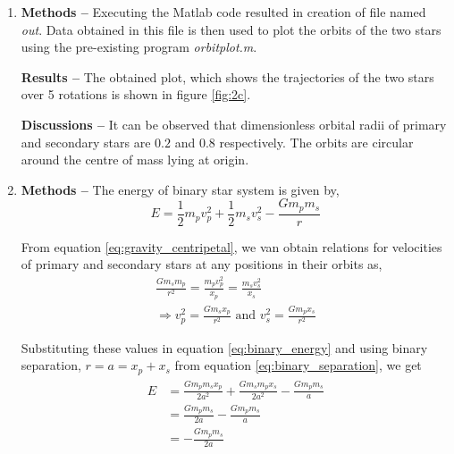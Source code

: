 \documentclass[a4paper]{article}
\begin{document}
\begin{enumerate} [label*=\textbf{(\alph*)}]
			
			\item
				\subitem \textbf{Methods  --}
				Executing the Matlab code resulted in creation of file named \emph{out}. Data obtained in this file is then used to plot the orbits of the two stars using the pre-existing program \emph{orbitplot.m}.
				
				\subitem \textbf{Results  --}
				The obtained plot, which shows the trajectories of the two stars over 5 rotations is shown in figure \ref{fig:2c}. 
				
				\subitem \textbf{Discussions  --}
				It can be observed that dimensionless orbital radii of primary and secondary stars are \(0.2\) and \(0.8\) respectively. The orbits are circular around the centre of mass lying at origin.
			
			
			\item
				\subitem \textbf{Methods  --}
				The energy of binary star system is given by,
				\begin{equation}
					E = \frac{1}{2} m_p v_p^2 + \frac{1}{2} m_s v_s^2 - \frac{G m_p m_s}{r}
					\label{eq:binary_energy}
				\end{equation}
				
				From equation \ref{eq:gravity_centripetal}, we van obtain relations for velocities of primary and secondary stars at any positions in their orbits as,
				\begin{equation}
					\begin{gathered}
						\frac{G m_s m_p}{r^2} = \frac{m_p v_p^2}{x_p} = \frac{m_s v_s^2}{x_s} \\
						\Rightarrow v_p^2 = \frac{G m_s x_p}{r^2} \text{ and } v_s^2 = \frac{G m_p x_s}{r^2}
					\end{gathered}
				\end{equation}
				
				Substituting these values in equation \ref{eq:binary_energy} and using binary separation, \(r = a = x_p+x_s\) from equation \ref{eq:binary_separation}, we get
				\begin{equation}
					\begin{gathered}
						\begin{aligned}
							E &= \frac{G m_p m_s x_p}{2a^2} + \frac{G m_s m_p x_s}{2a^2} - \frac{G m_p m_s}{a} \\
							&= \frac{G m_p m_s}{2a} - \frac{G m_p m_s}{a}\\
							&= -\frac{G m_p m_s}{2a} 
						\end{aligned}
					\end{gathered}
				\end{equation}
				

\end{enumerate}
\end{document}

